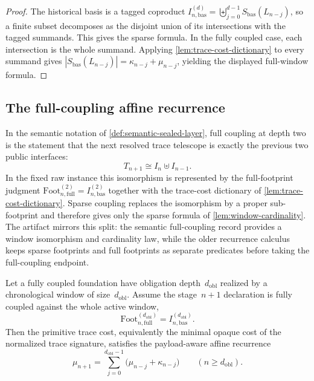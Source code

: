\documentclass{lmcs}
\newcommand{\Foot}{\mathrm{Foot}}
\begin{document}
\begin{proof}
The historical basis is a tagged coproduct
$I_{n,\mathrm{bas}}^{(d)}=\biguplus_{j=0}^{d-1}S_{\mathrm{bas}}(L_{n-j})$,
so a finite subset decomposes as the disjoint union of its intersections with
the tagged summands. This gives the sparse formula. In the fully coupled case,
each intersection is the whole summand. Applying
\autoref{lem:trace-cost-dictionary} to every summand gives
$|S_{\mathrm{bas}}(L_{n-j})|=\kappa_{n-j}+\mu_{n-j}$, yielding the displayed
full-window formula.
\end{proof}

\subsection{The full-coupling affine recurrence}

In the semantic notation of \autoref{def:semantic-sealed-layer}, full coupling
at depth two is the statement that the next resolved trace telescope is exactly
the previous two public interfaces:
\[
  T_{n+1} \cong I_n \uplus I_{n-1}.
\]
In the fixed raw instance this isomorphism is represented by the full-footprint
judgment $\Foot_{n,\mathrm{full}}^{(2)}=I_{n,\mathrm{bas}}^{(2)}$ together with
the trace-cost dictionary of \autoref{lem:trace-cost-dictionary}. Sparse
coupling replaces the isomorphism by a proper sub-footprint and therefore gives
only the sparse formula of \autoref{lem:window-cardinality}.
The artifact mirrors this split: the semantic full-coupling record provides a
window isomorphism and cardinality law, while the older recurrence calculus
keeps sparse footprints and full footprints as separate predicates before taking
the full-coupling endpoint.

\begin{thm}
\label{thm:recurrence}
\label{thm:full-coupling-affine-recurrence}
Let a fully coupled foundation have obligation depth~$d_{\mathrm{obl}}$ realized by a chronological window of size~$d_{\mathrm{obl}}$. Assume the stage~$n+1$ declaration is fully coupled against the whole active window,
\[
  \Foot_{n,\mathrm{full}}^{(d_{\mathrm{obl}})}
  =
  I_{n,\mathrm{bas}}^{(d_{\mathrm{obl}})}.
\]
Then the primitive trace cost, equivalently the minimal opaque cost of the normalized trace signature, satisfies the payload-aware affine recurrence
\[
  \mu_{n+1} = \sum_{j=0}^{d_{\mathrm{obl}}-1} \bigl(\mu_{n-j} + \kappa_{n-j}\bigr)
  \qquad
  (n \geq d_{\mathrm{obl}}).
\]
\end{thm}
\end{document}
